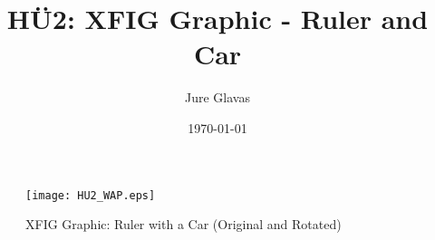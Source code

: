 \documentclass[a4paper,12pt]{article}
\begin{document}
\title{HÜ2: XFIG Graphic - Ruler and Car}
\author{Jure Glavas}
\date{\today}

\maketitle

\begin{figure}[h!]
    \centering
    \texttt{[image: HU2\_WAP.eps]} %
    \caption{XFIG Graphic: Ruler with a Car (Original and Rotated)}
    \label{fig:auto_ruler}
\end{figure}
\end{document}
